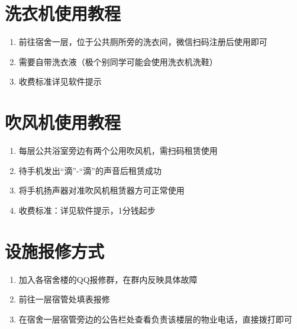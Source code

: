 \section[洗衣机使用教程]{洗衣机使用教程}
\begin{enumerate}
    \item 前往宿舍一层，位于公共厕所旁的洗衣间，微信扫码注册后使用即可
    \item 需要自带洗衣液（极个别同学可能会使用洗衣机洗鞋）
    \item 收费标准详见软件提示
\end{enumerate}

\section[吹风机使用教程]{吹风机使用教程}
\begin{enumerate}
    \item 每层公共浴室旁边有两个公用吹风机，需扫码\footnotemark 租赁使用
    \item 待手机发出“滴”-“滴”的声音后租赁成功
    \item 将手机扬声器对准吹风机租赁器方可正常使用
    \item 收费标准：详见软件提示，1分钱起步
\end{enumerate}

\section[设施报修方式]{设施报修方式}
\begin{enumerate}
    \item 加入各宿舍楼的QQ报修群，在群内反映具体故障
    \item 前往一层宿管处填表报修
    \item 在宿舍一层宿管旁边的公告栏处查看负责该楼层的物业电话，直接拨打即可
\end{enumerate}

